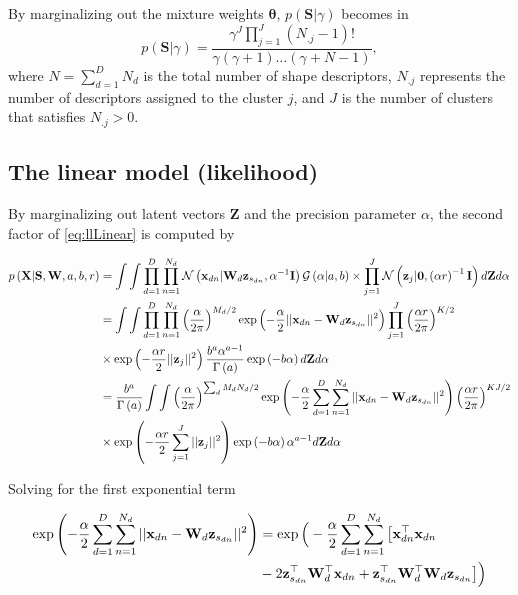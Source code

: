 	
	By marginalizing out the mixture weights $\boldsymbol{\theta}$, $p\left(\mathbf{S}|\gamma\right)$ becomes in
	\begin{equation}
	p\left(\mathbf{S}|\gamma\right) =\frac{\gamma^{J}\prod\limits_{j=1}^{J}{\left(N_{.j}-1\right)!}}{\gamma\left(\gamma+1\right)\dots\left(\gamma+N-1\right)},
	\end{equation}
	where $N=\sum\limits_{d=1}^{D}N_d$ is the total number of shape
	descriptors, $N_{.j}$ represents the number of descriptors assigned to
	the cluster $j$, and $J$ is the number of clusters that satisfies
	$N_{.j}>0$. 
	
	\subsection{The linear model (likelihood)}
	By marginalizing out latent vectors $\mathbf{Z}$ and the
	precision parameter $\alpha$, the second factor of \eqref{eq:llLinear} is
	computed by
	
	\begin{align}
	p\left(\mathbf{X}|\mathbf{S},\mathbf{W},a,b,r\right) &=  \int \int \prod_{d=1}^{D}\prod_{n=1}^{N_d}{\mathcal{N}\left(\mathbf{x}_{dn}|\mathbf{W}_d \mathbf{z}_{s_{dn}},\alpha^{-1}\mathbf{I}\right)\mathcal{G}\left(\alpha|a,b\right)} \times \prod_{j=1}^{J}\mathcal{N}\left(\mathbf{z}_j|\mathbf{0},\left(\alpha r\right)^{-1}\mathbf{I}\right)d\boldsymbol{\mathrm{Z}} d\alpha  \notag \\
	&=\int \int \prod_{d=1}^{D}\prod_{n=1}^{N_d}\left(\frac{\alpha}{2\pi}\right)^{M_d /2}\exp\left(-\frac{\alpha}{2}||\mathbf{x}_{dn}-\mathbf{W}_d\mathbf{z}_{s_{dn}}||^2\right) \prod_{j=1}^{J}\left(\frac{\alpha r}{2\pi}\right)^{K/2} \notag \\
	&\times \exp\left(-\frac{\alpha r}{2}||\mathbf{z}_j||^2\right)\frac{b^a \alpha^{a-1}}{\Gamma\left(a\right)}\exp\left(-b\alpha\right)d\boldsymbol{\mathrm{Z}} d\alpha \notag\\
	&=\frac{b^a}{\Gamma\left(a\right)}\int \int \left(\frac{\alpha}{2\pi}\right)^{\sum_d M_d N_d /2}\exp\left(-\frac{\alpha}{2} \sum_{d=1}^{D}\sum_{n=1}^{N_d}||\mathbf{x}_{dn}-\mathbf{W}_d\mathbf{z}_{s_{dn}}||^2\right)\left(\frac{\alpha r}{2\pi}\right)^{KJ/2} \notag \\
	&\times \exp\left(-\frac{\alpha r}{2} \sum_{j=1}^{J}||\mathbf{z}_j||^2\right)\exp\left(-b\alpha\right)\alpha^{a-1}d\boldsymbol{\mathrm{Z}} d\alpha 
	\label{eq:llnmlin}
	\end{align}
	
	
	Solving for the first exponential term
	
	\begin{align}
	\exp\left(-\frac{\alpha}{2} \sum_{d=1}^{D}\sum_{n=1}^{N_d}||\mathbf{x}_{dn}-\mathbf{W}_d\mathbf{z}_{s_{dn}}||^2\right) &= \exp\Big(-\frac{\alpha}{2} \sum_{d=1}^{D}\sum_{n=1}^{N_d}\big[ \mathbf{x}_{dn}^\top \mathbf{x}_{dn}  \notag\\
	&  - 2 \mathbf{z}_{s_{dn}} ^\top \mathbf{W}_d^\top \mathbf{x}_{dn} + \mathbf{z}_{s_{dn}}^\top \mathbf{W}_d^\top \mathbf{W}_d \mathbf{z}_{s_{dn}} \big]\Big) \notag\\
	\label{eq:exp_XWzlin}
	\end{align}
	
